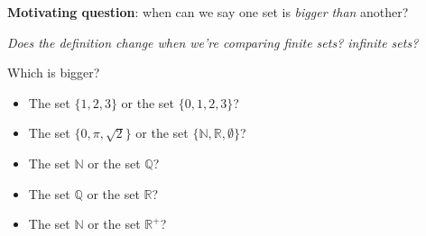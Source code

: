 
{\bf Motivating question}: when can we say one set is {\it bigger than} another?

{\it Does the definition change when we're comparing finite sets? infinite sets?}

Which is bigger? 
\begin{itemize}
    \item The set $\{1,2,3\}$ or the set $\{0,1,2,3\}$?
    \item The set $\{0, \pi, \sqrt{2} \}$ or the set $\{\mathbb{N}, \mathbb{R}, \emptyset\}$?
    \item The set $\mathbb{N}$ or the set $\mathbb{Q}$?
    \item The set $\mathbb{Q}$ or the set $\mathbb{R}$?
    \item The set $\mathbb{N}$ or the set $\mathbb{R}^+$?
\end{itemize}

